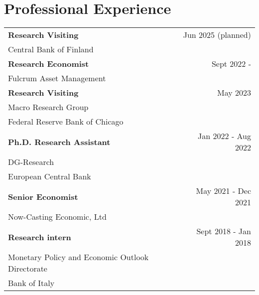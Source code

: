 \documentclass[a4paper,12pt]{article}
\begin{document}
\section{Professional Experience}
\begin{tabular*}{\linewidth}{@{}l@{\extracolsep{\fill}}r}
\textbf{Research Visiting} & Jun 2025 (planned)$\;\;$\\
Central Bank of Finland\\[1em]
\textbf{Research Economist} & Sept 2022 - \phantom{Aug 2024}\\[.2em]
Fulcrum Asset Management\\[1em]
\textbf{Research Visiting} & May 2023 \phantom{-Sept 2024}\\
Macro Research Group\\
Federal Reserve Bank of Chicago\\[1em]
\textbf{Ph.D. Research Assistant} & Jan 2022 - Aug 2022\\[.2em]
DG-Research\\
European Central Bank\\[1em]
\textbf{Senior Economist} & May 2021 - Dec 2021\\[.2em]
Now-Casting Economic, Ltd\\[1em]
\textbf{Research intern} & Sept 2018 - Jan 2018\\[.2em]
Monetary Policy and Economic Outlook Directorate\\
Bank of Italy
\end{tabular*}
\end{document}
